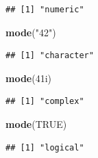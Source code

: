 \documentclass[
]{article}
\newenvironment{Shaded}{\begin{snugshade}}{\end{snugshade}}
\newcommand{\ConstantTok}[1]{\textcolor[rgb]{0.56,0.35,0.01}{#1}}
\newcommand{\DataTypeTok}[1]{\textcolor[rgb]{0.13,0.29,0.53}{#1}}
\newcommand{\DecValTok}[1]{\textcolor[rgb]{0.00,0.00,0.81}{#1}}
\newcommand{\FunctionTok}[1]{\textcolor[rgb]{0.13,0.29,0.53}{\textbf{#1}}}
\newcommand{\NormalTok}[1]{#1}
\newcommand{\StringTok}[1]{\textcolor[rgb]{0.31,0.60,0.02}{#1}}
\begin{document}
\begin{verbatim}
## [1] "numeric"
\end{verbatim}

\begin{Shaded}
\begin{Highlighting}[]
 \FunctionTok{mode}\NormalTok{(}\StringTok{"42"}\NormalTok{)}
\end{Highlighting}
\end{Shaded}

\begin{verbatim}
## [1] "character"
\end{verbatim}

\begin{Shaded}
\begin{Highlighting}[]
 \FunctionTok{mode}\NormalTok{(}\DecValTok{41}\DataTypeTok{i}\NormalTok{)}
\end{Highlighting}
\end{Shaded}

\begin{verbatim}
## [1] "complex"
\end{verbatim}

\begin{Shaded}
\begin{Highlighting}[]
 \FunctionTok{mode}\NormalTok{(}\ConstantTok{TRUE}\NormalTok{)}
\end{Highlighting}
\end{Shaded}

\begin{verbatim}
## [1] "logical"
\end{verbatim}
\end{document}

